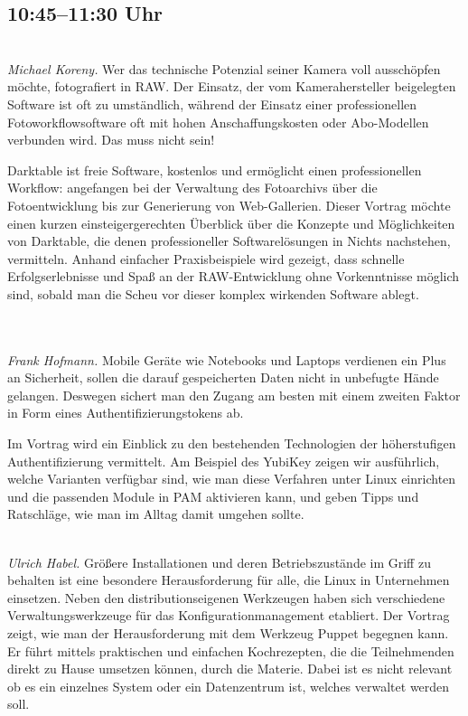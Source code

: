 \documentclass[10pt,a4paper,ngerman]{scrartcl}
\let\origdescription\description
\renewenvironment{description}{
  \setlength{\leftmargini}{0em}
  \origdescription
  \setlength{\itemindent}{0em}
  \setlength{\itemsep}{1.2em}
  \setlength{\labelsep}{\textwidth}
}
{\endlist}
\newcommand{\vorschub}{\mbox{}\\[-0.5em]}
\begin{document}
\begin{multicols}{2}

\section{10:45--11:30 Uhr}

\begin{description}
\item[Fotobearbeitung und -verwaltung mit Darktable]\vorschub
\textsl{Michael Koreny.}
Wer das technische Potenzial seiner Kamera voll ausschöpfen möchte, fotografiert in RAW. Der Einsatz, der vom Kamerahersteller beigelegten Software ist oft zu umständlich, während der Einsatz einer professionellen Fotoworkflowsoftware oft mit hohen Anschaffungskosten oder Abo-Modellen verbunden wird. Das muss nicht sein!

Darktable ist freie Software, kostenlos und ermöglicht einen professionellen Workflow: angefangen bei der Verwaltung des Fotoarchivs über die Fotoentwicklung bis zur Generierung von Web-Gallerien. Dieser Vortrag möchte einen kurzen einsteigergerechten Überblick über die Konzepte und Möglichkeiten von Darktable, die denen professioneller Softwarelösungen in Nichts nachstehen, vermitteln. Anhand einfacher Praxisbeispiele wird gezeigt, dass schnelle Erfolgserlebnisse und Spaß an der RAW-Entwicklung ohne Vorkenntnisse möglich sind, sobald man die Scheu vor dieser komplex wirkenden Software ablegt.



\item[{\parbox[t]{\linewidth}{YubiKey. Praktikable Zwei-Faktor-Authentifizierung für Linux und mobile Geräte}}]\vorschub\\
\textsl{Frank Hofmann.}
Mobile Geräte wie Notebooks und Laptops verdienen ein Plus an Sicherheit, sollen die darauf gespeicherten Daten nicht in unbefugte Hände gelangen. Deswegen sichert man den Zugang am besten mit einem zweiten Faktor in Form eines Authentifizierungstokens ab.

Im Vortrag wird ein Einblick zu den bestehenden Technologien der höherstufigen Authentifizierung vermittelt. Am Beispiel des YubiKey zeigen wir ausführlich, welche Varianten verfügbar sind, wie man diese Verfahren unter Linux einrichten und die passenden Module in PAM aktivieren kann, und geben Tipps und Ratschläge, wie man im Alltag damit umgehen sollte.




\item[Zentrale Konfigurationsverwaltung mit Puppet]\vorschub
\textsl{Ulrich Habel.} Größere Installationen und deren Betriebszustände im Griff zu behalten ist eine besondere Herausforderung für alle, die Linux in Unternehmen einsetzen. Neben den distributionseigenen Werkzeugen haben sich verschiedene Verwaltungswerkzeuge für das Konfigurationmanagement etabliert. Der Vortrag zeigt, wie man der Herausforderung mit dem Werkzeug Puppet begegnen kann. Er führt mittels praktischen und einfachen Kochrezepten, die die Teilnehmenden direkt zu Hause umsetzen können, durch die Materie. Dabei ist es nicht relevant ob es ein einzelnes System oder ein Datenzentrum ist, welches verwaltet werden soll.


\end{description}
\end{multicols}
\end{document}
